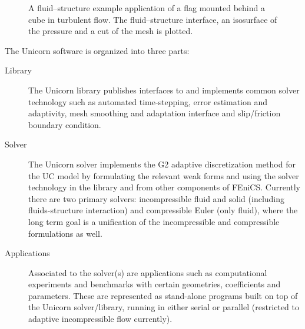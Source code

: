 
\begin{figure}[!h]
\caption{
A fluid--structure example application of a flag mounted behind a cube in turbulent flow. The fluid--structure interface, an isosurface of the pressure and a cut of the mesh is plotted.
}
\label{fig:flag3D}
\end{figure}

The Unicorn software is organized into three parts:
\begin{description}
\item[Library]
The Unicorn library publishes interfaces to and implements common
solver technology such as automated time-stepping, error
estimation and adaptivity, mesh smoothing and adaptation interface and
slip/friction boundary condition.
\item[Solver]
The Unicorn solver implements the G2 adaptive discretization method
for the UC model by formulating the relevant weak forms and using the
solver technology in the library and from other components of
FEniCS. Currently there are two primary solvers: incompressible
fluid and solid (including fluids-structure interaction) and compressible
Euler (only fluid), where the long term goal is a unification of the
incompressible and compressible formulations as well.
\item[Applications]
Associated to the solver(s) are applications such as computational
experiments and benchmarks with certain geometries, coefficients and
parameters. These are represented as stand-alone programs built on top
of the Unicorn solver/library, running in either serial or parallel
(restricted to adaptive incompressible flow currently).
\end{description}

